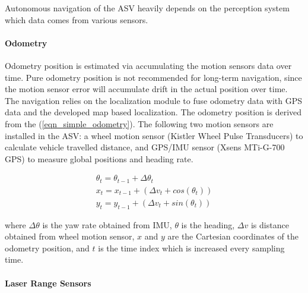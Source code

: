 \documentclass[10 pt,a4paper,conference]{IEEEtran}
\begin{document}
Autonomous navigation of the ASV heavily depends on the perception
system which data comes from various sensors.

\paragraph{Odometry}\label{odometry}

Odometry position is estimated via accumulating the motion sensors data
over time. Pure odometry position is not recommended for long-term
navigation, since the motion sensor error will accumulate drift in the
actual position over time. The navigation relies on the localization
module to fuse odometry data with GPS data and the developed map based
localization. The odometry position is derived from the
(\ref{eqn_simple_odometry}). The following two motion sensors are
installed in the ASV: a wheel motion sensor (Kistler Wheel Pulse
Transducers) to calculate vehicle travelled distance, and GPS/IMU sensor
(Xsens MTi-G-700 GPS) to measure global positions and heading rate.

\begin{equation}
\begin{split}
\label{eqn_simple_odometry}
\theta_t = \theta_{t-1} + \Delta\theta_{t} \\
x_t = x_{t-1} + (\Delta v_t + cos(\theta_t)) \\
y_t = y_{t-1} + (\Delta v_t + sin(\theta_t))
\end{split}
\end{equation}

where $\Delta\theta$ is the yaw rate obtained from IMU, $\theta$ is the
heading, $\Delta v$ is distance obtained from wheel motion sensor, $x$
and $y$ are the Cartesian coordinates of the odometry position, and $t$
is the time index which is increased every sampling time.

\paragraph{Laser Range Sensors}\label{laser-range-sensors}
\end{document}
